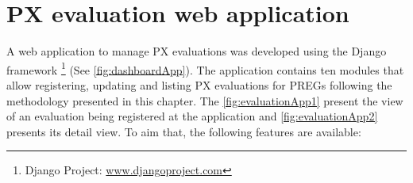 












\section{PX evaluation web application}
A web application to manage \ac{PX} evaluations was developed using the Django framework \footnote{Django Project: \url{www.djangoproject.com}} (See \autoref{fig:dashboardApp}). The application contains ten modules that allow registering, updating and listing \ac{PX} evaluations for \acp{PREG} following the methodology presented in this chapter. The \autoref{fig:evaluationApp1} present the view of an evaluation being registered at the application and \autoref{fig:evaluationApp2} presents its detail view. To aim that, the following features are available:


